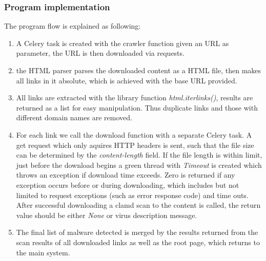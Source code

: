 \subsubsection{Program implementation}
The program flow is explained as following:
\begin{enumerate}
\item A Celery task is created with the crawler function given an URL as 
parameter, the URL is then downloaded via requests. 
\item the HTML parser parses the downloaded content as a HTML file, then makes 
all links in it absolute, which is achieved with the base URL provided. 
\item All links are extracted with the library function {\em html.iterlinks()}, 
results are returned as a list for easy manipulation. Thus duplicate links and 
those with different domain names are removed.
\item For each link we call the download function with a separate Celery 
task. A get request which only 
aquires HTTP headers is sent, such that the file size can be determined by the 
{\em content-length} field. If the file length is within limit, just before 
the download begins a green thread with {\em Timeout} is created which throws 
an exception if download time exceeds. Zero is returned if any exception 
occurs before or during downloading, which includes but not limited to request 
exceptions (such as error response code) and time outs. After successful 
downloading a clamd scan to the content is called, the return value should be 
either {\em None} or virus description message. 
\item The final list of malware detected is merged by the results 
returned from the scan results of all downloaded links as well as the root 
page, which returns to the main system.  
\end{enumerate}
